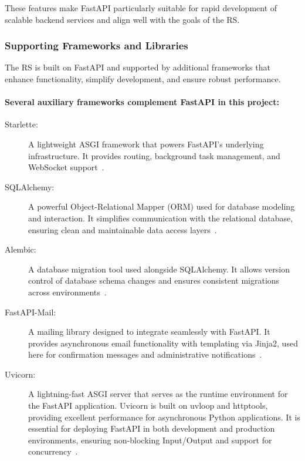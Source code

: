 These features make FastAPI particularly suitable for rapid development of scalable backend services and align well with the goals of the RS.

\subsubsection{Supporting Frameworks and Libraries}

The RS is built on FastAPI and supported by additional frameworks that enhance functionality, simplify development, and ensure robust performance.


\paragraph{Several auxiliary frameworks complement FastAPI in this project:}

\begin{description}
  \item[Starlette:] A lightweight ASGI framework that powers FastAPI’s underlying infrastructure. It provides routing, background task management, and WebSocket support~\cite{Starlette}.
  \item[SQLAlchemy:] A powerful Object-Relational Mapper (ORM) used for database modeling and interaction. It simplifies communication with the relational database, ensuring clean and maintainable data access layers~\cite{SQLAlchemy}.
  \item[Alembic:] A database migration tool used alongside SQLAlchemy. It allows version control of database schema changes and ensures consistent migrations across environments~\cite{Alembic}.
  \item[FastAPI-Mail:] A mailing library designed to integrate seamlessly with FastAPI. It provides asynchronous email functionality with templating via Jinja2, used here for confirmation messages and administrative notifications~\cite{FastAPIMail}.
  \item[Uvicorn:] A lightning-fast ASGI server that serves as the runtime environment for the FastAPI application. Uvicorn is built on uvloop and httptools, providing excellent performance for asynchronous Python applications. It is essential for deploying FastAPI in both development and production environments, ensuring non-blocking Input/Output and support for concurrency~\cite{Uvicorn}.
\end{description}

